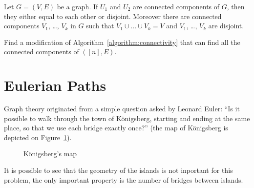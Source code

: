 \begin{theorem}
  Let $G = (V, E)$ be a graph.
  If $U_1$ and $U_2$ are connected components of $G$, then they
  either equal to each other or disjoint.
  Moreover there are connected components
  $V_1$, \dots, $V_k$ in $G$ such that $V_1 \cup \dots \cup V_k = V$
  and $V_1$, \dots, $V_k$ are disjoint.
\end{theorem}

\begin{exercise}
  Find a modification of Algorithm~\ref{algorithm:connectivity}
  that can find all the connected components of $([n], E)$.
\end{exercise}

\section{Eulerian Paths}

Graph theory originated from a simple question asked by Leonard Euler:
``Is it possible to walk through the town of K\"{o}nigsberg, starting and
ending at the same place, so that we use each bridge exactly once?''
(the map of K\"{o}nigsberg is depicted on Figure~\ref{figure:konigsberg}).
\begin{figure}
  \begin{center}
  \end{center}
  \caption{K\"{o}nigsberg's map}
  \label{figure:konigsberg}
\end{figure}
It is possible to see that the geometry of the islands is not inportant for
this problem, the only important property is the number of bridges between
islands.

